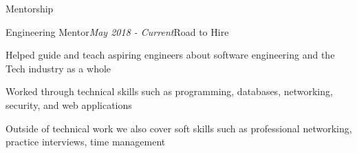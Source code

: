 \documentclass{resume} %
\begin{document}
\begin{rSection}{\vspace{-5pt}Mentorship}
  \begin{rSubsection}{Engineering Mentor}{\em May 2018 - Current}{Road to Hire}{}
  \item {Helped guide and teach aspiring engineers about software engineering and the Tech industry as a whole}
  \item {Worked through technical skills such as programming, databases, networking, security, and web applications}
  \item {Outside of technical work we also cover soft skills such as professional networking, practice interviews, time management}
  \end{rSubsection}

\end{rSection}

%
%
%



\end{document}
